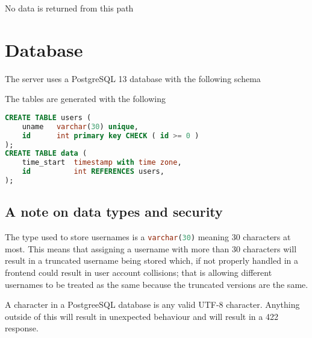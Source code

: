 \documentclass{../../Reports/custom}
\begin{document}
No data is returned from this path

\section{Database}

The server uses a PostgreSQL 13 database with the following schema

\begin{center}
\end{center}

The tables are generated with the following

\begin{lstlisting}[language=sql]
CREATE TABLE users (
    uname   varchar(30) unique,
    id      int primary key CHECK ( id >= 0 )
);
CREATE TABLE data (
    time_start  timestamp with time zone,
    id  	    int REFERENCES users,
);	
\end{lstlisting}

\subsection{A note on data types and security}
\label{ssec:dtypes-and-sec}

The type used to store usernames is a \lstinline[language=sql]{varchar(30)} meaning 30 characters at most. This means that assigning a username with more than 30 characters will result in a truncated username being stored which, if not properly handled in a frontend could result in user account collisions; that is allowing different usernames to be treated as the same because the truncated versions are the same.

A character in a PostgreeSQL database is any valid UTF-8 character. Anything outside of this will result in unexpected behaviour and will result in a 422 response.


\end{document}
